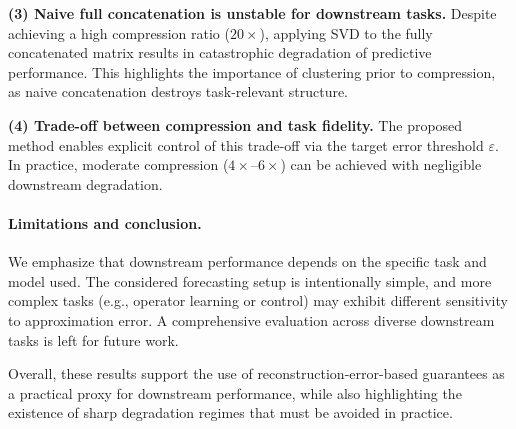 \documentclass[10pt]{article} %
\begin{document}
\textbf{(3) Naive full concatenation is unstable for downstream tasks.}
Despite achieving a high compression ratio ($20\times$), applying SVD to the fully concatenated matrix results in catastrophic degradation of predictive performance.
This highlights the importance of clustering prior to compression, as naive concatenation destroys task-relevant structure.

\textbf{(4) Trade-off between compression and task fidelity.}
The proposed method enables explicit control of this trade-off via the target error threshold $\varepsilon$.
In practice, moderate compression ($4\times$--$6\times$) can be achieved with negligible downstream degradation.

\paragraph{Limitations and conclusion.}
We emphasize that downstream performance depends on the specific task and model used.
The considered forecasting setup is intentionally simple, and more complex tasks (e.g., operator learning or control) may exhibit different sensitivity to approximation error.
A comprehensive evaluation across diverse downstream tasks is left for future work.

Overall, these results support the use of reconstruction-error-based guarantees as a practical proxy for downstream performance, while also highlighting the existence of sharp degradation regimes that must be avoided in practice.
\end{document}
